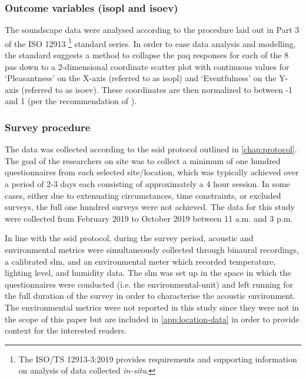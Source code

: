 
\subsubsection*{Outcome variables (\gls{isopl} and \gls{isoev})}

The soundscape data were analysed according to the procedure laid out in Part 3 of the ISO 12913 \footnote{The ISO/TS 12913-3:2019 provides requirements and supporting information on analysis of data collected \emph{in-situ}.} standard series. In order to ease data analysis and modelling, the standard suggests a method to collapse the \gls{paq} responses for each of the 8 \glspl{pa} down to a 2-dimensional coordinate scatter plot with continuous values for `Pleasantness' on the X-axis (referred to as \gls{isopl}) and `Eventfulness' on the Y-axis (referred to as \gls{isoev}). These coordinates are then normalized to between -1 and 1 (per the recommendation of \citet{ISO12913Part3}).

\subsubsection*{Survey procedure}

The data was collected according to the \gls{ssid} protocol outlined in \cref{chap:protocol}. The goal of the researchers on site was to collect a minimum of one hundred questionnaires from each selected site/location, which was typically achieved over a period of 2-3 days each consisting of approximately a 4 hour session. In some cases, either due to extenuating circumstances, time constraints, or excluded surveys, the full one hundred surveys were not achieved. The data for this study were collected from  February 2019 to  October 2019 between 11 a.m. and 3 p.m.

In line with the \gls{ssid} protocol, during the survey period, acoustic and environmental metrics were simultaneously collected through binaural recordings, a calibrated \gls{slm}, and an environmental meter which recorded temperature, lighting level, and humidity data. The \gls{slm} was set up in the space in which the questionnaires were conducted (i.e. the \gls{environmental-unit}) and left running for the full duration of the survey in order to characterise the acoustic environment. The environmental metrics were not reported in this study since they were not in the scope of this paper but are included in \cref{app:location-data} in order to provide context for the interested readers. 

